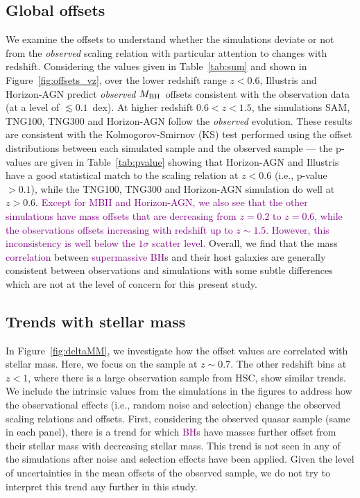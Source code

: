 \documentclass[twocolumn]{aastex631}
\newcommand{\todo}[1]{\textcolor{red}{[{\bf TODO}: #1]}}
\newcommand{\red}[1]{\textcolor{purple}{#1}}
\def\mbh{$M_{\rm BH}$}
\begin{document}
\subsection{Global offsets}\label{subsec:offset}
We examine the offsets to understand whether the simulations deviate or not from the {\it observed} scaling relation with particular attention to changes with redshift. Considering the values given in Table~\ref{tab:sum} and shown in Figure~\ref{fig:offsets_vz}, over the lower redshift range $z<0.6$, Illustris and Horizon-AGN predict {\it observed} \mbh\ offsets consistent with the observation data (at a level of $\lesssim0.1$~dex). At higher redshift $0.6<z<1.5$, the simulations SAM, TNG100, TNG300 and Horizon-AGN follow the {\it observed} evolution. These results are consistent with the Kolmogorov-Smirnov (KS) test performed using the offset distributions between each simulated sample and the observed sample --- the p-values are given in Table~\ref{tab:pvalue} showing that Horizon-AGN and Illustris have a good statistical match to the scaling relation at $z<0.6$ (i.e., p-value $> 0.1$), while the TNG100, TNG300 and Horizon-AGN simulation do well at $z>0.6$. 
\red{Except for MBII and Horizon-AGN, we also see that the other simulations have mass offsets that are decreasing from $z=0.2$ to $z=0.6$, while the observations offsets increasing with redshift up to $z\sim1.5$. However, this inconsistency is well below the $1\sigma$ scatter level.}
Overall, we find that the mass \red{correlation} between \red{supermassive BH}s and their host galaxies are generally consistent between observations and simulations with some subtle differences which are not at the level of concern for this present study.


\subsection{Trends with stellar mass}
In Figure~\ref{fig:deltaMM}, we investigate how the offset values are correlated with stellar mass. Here, we focus on the sample at $z\sim0.7$. The other redshift bins at $z<1$, where there is a large observation sample from HSC, show similar trends. We include the intrinsic values from the simulations in the figures to address how the observational effects (i.e., random noise and selection) change the observed scaling relations and offsets. First, considering the observed quasar sample (same in each panel), there is a trend for which \red{BH}s have masses further offset from their stellar mass with decreasing stellar mass. This trend is not seen in any of the simulations after noise and selection effects have been applied. Given the level of uncertainties in the mean offsets of the observed sample, we do not try to interpret this trend any further in this study.
\end{document}
